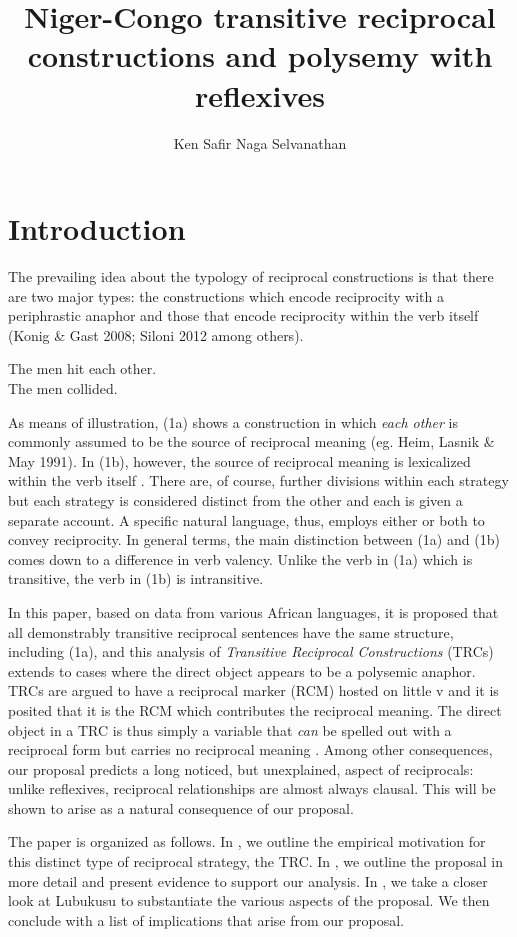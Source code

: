 \documentclass[output=paper]{langsci/langscibook}
\title{Niger-Congo transitive reciprocal constructions and polysemy with reflexives}
\author{%
 Ken Safir\lastand 
 Naga Selvanathan \affiliation{Rutgers University} 
}
\begin{document}
 

\section{Introduction}

 The prevailing idea about the typology of reciprocal constructions is that there are two major types: the constructions which encode reciprocity with a periphrastic anaphor and those that encode reciprocity within the verb itself (Konig \& Gast 2008; Siloni 2012 among others).


\ea
\ea
The men hit each other.  \\
\ex
The men collided.\\
\z
\z

As means of illustration, (1a) shows a construction in which \textit{each other} is commonly assumed to be the source of reciprocal meaning (eg. Heim, Lasnik \& May 1991). In (1b), however, the source of reciprocal meaning is lexicalized within the verb itself \citep{Siloni2012}.  There are, of course, further divisions within each strategy but each strategy is considered distinct from the other and each is given a separate account. A specific natural language, thus, employs either or both to convey reciprocity. In general terms, the main distinction between (1a) and (1b) comes down to a difference in verb valency. Unlike the verb in (1a) which is transitive, the verb in (1b) is intransitive.
 
  In this paper, based on data from various African languages, it is proposed that all demonstrably transitive reciprocal sentences have the same structure, including (1a), and this analysis of \textit{Transitive Reciprocal Constructions} (TRCs) extends to cases where the direct object appears to be a polysemic anaphor. TRCs are argued to have a reciprocal marker (RCM) hosted on little v and it is posited that it is the RCM which contributes the reciprocal meaning. The direct object in a TRC is thus simply a variable that \textit{can} be spelled out with a reciprocal form but carries no reciprocal meaning \citep{Safir2014}. Among other consequences, our proposal predicts a long noticed, but unexplained, aspect of reciprocals: unlike reflexives, reciprocal relationships are almost always clausal. This will be shown to arise as a natural consequence of our proposal.
 
  The paper is organized as follows. In , we outline the empirical motivation for this distinct type of reciprocal strategy, the TRC. In , we outline the proposal in more detail and present evidence to support our analysis. In , we take a closer look at Lubukusu to substantiate the various aspects of the proposal. We then conclude with a list of implications that arise from our proposal.
 
\end{document}
